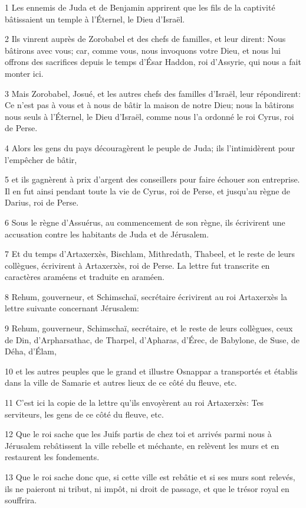 \par 1 Les ennemis de Juda et de Benjamin apprirent que les fils de la captivité bâtissaient un temple à l'Éternel, le Dieu d'Israël.
\par 2 Ils vinrent auprès de Zorobabel et des chefs de familles, et leur dirent: Nous bâtirons avec vous; car, comme vous, nous invoquons votre Dieu, et nous lui offrons des sacrifices depuis le temps d'Ésar Haddon, roi d'Assyrie, qui nous a fait monter ici.
\par 3 Mais Zorobabel, Josué, et les autres chefs des familles d'Israël, leur répondirent: Ce n'est pas à vous et à nous de bâtir la maison de notre Dieu; nous la bâtirons nous seuls à l'Éternel, le Dieu d'Israël, comme nous l'a ordonné le roi Cyrus, roi de Perse.
\par 4 Alors les gens du pays découragèrent le peuple de Juda; ils l'intimidèrent pour l'empêcher de bâtir,
\par 5 et ils gagnèrent à prix d'argent des conseillers pour faire échouer son entreprise. Il en fut ainsi pendant toute la vie de Cyrus, roi de Perse, et jusqu'au règne de Darius, roi de Perse.
\par 6 Sous le règne d'Assuérus, au commencement de son règne, ils écrivirent une accusation contre les habitants de Juda et de Jérusalem.
\par 7 Et du temps d'Artaxerxès, Bischlam, Mithredath, Thabeel, et le reste de leurs collègues, écrivirent à Artaxerxès, roi de Perse. La lettre fut transcrite en caractères araméens et traduite en araméen.
\par 8 Rehum, gouverneur, et Schimschaï, secrétaire écrivirent au roi Artaxerxès la lettre suivante concernant Jérusalem:
\par 9 Rehum, gouverneur, Schimschaï, secrétaire, et le reste de leurs collègues, ceux de Din, d'Arpharsathac, de Tharpel, d'Apharas, d'Érec, de Babylone, de Suse, de Déha, d'Élam,
\par 10 et les autres peuples que le grand et illustre Osnappar a transportés et établis dans la ville de Samarie et autres lieux de ce côté du fleuve, etc.
\par 11 C'est ici la copie de la lettre qu'ils envoyèrent au roi Artaxerxès: Tes serviteurs, les gens de ce côté du fleuve, etc.
\par 12 Que le roi sache que les Juifs partis de chez toi et arrivés parmi nous à Jérusalem rebâtissent la ville rebelle et méchante, en relèvent les murs et en restaurent les fondements.
\par 13 Que le roi sache donc que, si cette ville est rebâtie et si ses murs sont relevés, ils ne paieront ni tribut, ni impôt, ni droit de passage, et que le trésor royal en souffrira.
